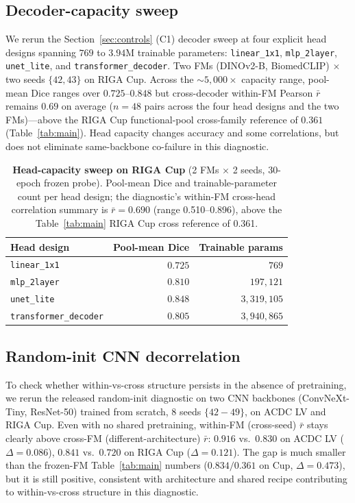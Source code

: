 \subsection{Decoder-capacity sweep}
\label{app:m3}

We rerun the Section~\ref{sec:controls} (C1) decoder sweep at four explicit head designs spanning $769$ to $3.94$M trainable parameters: \texttt{linear\_1x1}, \texttt{mlp\_2layer}, \texttt{unet\_lite}, and \texttt{transformer\_decoder}. Two FMs (DINOv2-B, BiomedCLIP) $\times$ two seeds $\{42, 43\}$ on RIGA Cup. Across the $\sim 5{,}000{\times}$ capacity range, pool-mean Dice ranges over $0.725$--$0.848$ but cross-decoder within-FM Pearson $\bar r$ remains $0.69$ on average ($n{=}48$ pairs across the four head designs and the two FMs)---above the RIGA Cup functional-pool cross-family reference of $0.361$ (Table~\ref{tab:main}). Head capacity changes accuracy and some correlations, but does not eliminate same-backbone co-failure in this diagnostic.

\begin{table}[!htbp]
  \caption{\textbf{Head-capacity sweep on RIGA Cup} (2 FMs $\times$ 2 seeds, 30-epoch frozen probe). Pool-mean Dice and trainable-parameter count per head design; the diagnostic's within-FM cross-head correlation summary is $\bar r{=}0.690$ (range 0.510--0.896), above the Table~\ref{tab:main} RIGA Cup cross reference of 0.361.}
  \label{tab:m3}
  \centering\small
  \begin{tabular}{lrr}
    \toprule
    Head design & Pool-mean Dice & Trainable params \\
    \midrule
    \texttt{linear\_1x1}          & $0.725$ & $769$ \\
    \texttt{mlp\_2layer}          & $0.810$ & $197{,}121$ \\
    \texttt{unet\_lite}           & $0.848$ & $3{,}319{,}105$ \\
    \texttt{transformer\_decoder} & $0.805$ & $3{,}940{,}865$ \\
    \bottomrule
  \end{tabular}
\end{table}

\subsection{Random-init CNN decorrelation}
\label{app:m9}

To check whether within-vs-cross structure persists in the absence of pretraining, we rerun the released random-init diagnostic on two CNN backbones (ConvNeXt-Tiny, ResNet-50) trained from scratch, $8$ seeds $\{42{-}49\}$, on ACDC LV and RIGA Cup. Even with no shared pretraining, within-FM (cross-seed) $\bar r$ stays clearly above cross-FM (different-architecture) $\bar r$: $0.916$ vs.\ $0.830$ on ACDC LV ($\Delta{=}0.086$), $0.841$ vs.\ $0.720$ on RIGA Cup ($\Delta{=}0.121$). The gap is much smaller than the frozen-FM Table~\ref{tab:main} numbers ($0.834/0.361$ on Cup, $\Delta{=}0.473$), but it is still positive, consistent with architecture and shared recipe contributing to within-vs-cross structure in this diagnostic.

